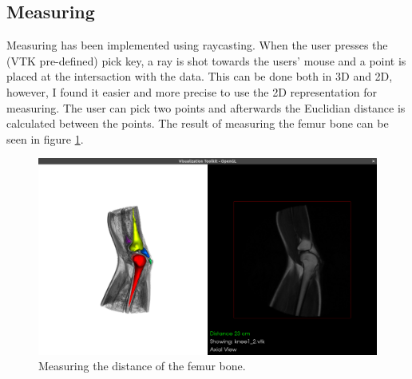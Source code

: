 \documentclass{article}
\begin{document}
\subsection{Measuring}
Measuring has been implemented using raycasting. When the user presses the (VTK pre-defined) pick key, a ray is shot towards the users' mouse and a point is placed at the intersaction with the data. This can be done both in 3D and 2D, however, I found it easier and more precise to use the 2D representation for measuring. The user can pick two points and afterwards the Euclidian distance is calculated between the points. The result of measuring the femur bone can be seen in figure \ref{fig:distance}.
\begin{figure}[H]
    \centering
    \includegraphics[width=\textwidth]{graphics/distance.png}
    \caption{Measuring the distance of the femur bone.}
    \label{fig:distance}
\end{figure}
\end{document}
